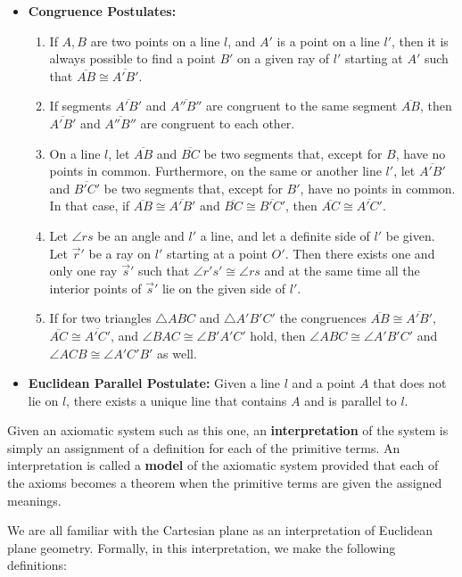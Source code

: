 \begin{itemize}
\item \textbf{Congruence Postulates:}
\begin{enumerate}
\item[(a)] If $A, B$ are two points on a line $l$, and $A'$ is a point on a line $l'$, then it is always possible to find a point $B'$ on a given ray of $l'$ starting at $A'$ such that $\overline{AB} \cong \overline{A'B'}$.
\item[(b)] If segments $\overline{A'B'}$ and $\overline{A''B''}$ are congruent to the same segment $\overline{AB}$, then $\overline{A'B'}$ and $\overline{A''B''}$ are congruent to each other.
\item[(c)] On a line $l$, let $\overline{AB}$ and $\overline{BC}$ be two segments that, except for $B$, have no points in common. Furthermore, on the same or another line $l'$, let $\overline{A'B'}$ and $\overline{B'C'}$ be two segments that, except for $B'$, have no points in common. In that case, if $\overline{AB} \cong \overline{A'B'}$ and $\overline{BC} \cong \overline{B'C'}$, then $\overline{AC} \cong \overline{A'C'}$.
\item[(d)] Let $\angle rs$ be an angle and $l'$ a line, and let a definite side of $l'$ be given. Let $\vec{r}'$ be a ray on $l'$ starting at a point $O'$. Then there exists one and only one ray $\vec{s}'$ such that $\angle r's' \cong \angle rs$ and at the same time all the interior points of $\vec{s}'$ lie on the given side of $l'$.
\item[(e)] If for two triangles $\triangle ABC$ and $\triangle A'B'C'$ the congruences $\overline{AB} \cong \overline{A'B'}$, $\overline{AC} \cong \overline{A'C'}$, and $\angle BAC \cong \angle B'A'C'$ hold, then $\angle ABC \cong \angle A'B'C'$ and $\angle ACB \cong \angle A'C'B'$ as well.
\end{enumerate}

\item \textbf{Euclidean Parallel Postulate:} Given a line $l$ and a point $A$ that does not lie on $l$, there exists a unique line that contains $A$ and is parallel to $l$.
\end{itemize}

Given an axiomatic system such as this one, an \textbf{interpretation} of the system is simply an assignment of a definition for each of the primitive terms. An interpretation is called a \textbf{model} of the axiomatic system provided that each of the axioms becomes a theorem when the primitive terms are given the assigned meanings.

We are all familiar with the Cartesian plane as an interpretation of Euclidean plane geometry. Formally, in this interpretation, we make the following definitions:

